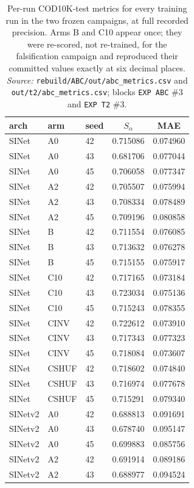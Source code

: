 \begin{table}[h]
\caption{Per-run COD10K-test metrics for every training run in the two frozen campaigns, at full
recorded precision. Arms B and C10 appear once; they were re-scored, not re-trained, for the
falsification campaign and reproduced their committed values exactly at six decimal places.
\emph{Source:} \texttt{rebuild/ABC/out/abc\_metrics.csv} and \texttt{out/t2/abc\_metrics.csv}; blocks
\texttt{EXP ABC} \#3 and \texttt{EXP T2} \#3.}
\label{tab:perrun}
\begin{center}\small
\begin{tabular}{lllcc}
\toprule
arch & arm & seed & $S_\alpha$ & MAE \\
\midrule
SINet & A0 & 42 & 0.715086 & 0.074960 \\
SINet & A0 & 43 & 0.681706 & 0.077044 \\
SINet & A0 & 45 & 0.706058 & 0.077347 \\
SINet & A2 & 42 & 0.705507 & 0.075994 \\
SINet & A2 & 43 & 0.708334 & 0.078489 \\
SINet & A2 & 45 & 0.709196 & 0.080858 \\
SINet & B & 42 & 0.711554 & 0.076085 \\
SINet & B & 43 & 0.713632 & 0.076278 \\
SINet & B & 45 & 0.715155 & 0.075917 \\
SINet & C10 & 42 & 0.717165 & 0.073184 \\
SINet & C10 & 43 & 0.723034 & 0.075136 \\
SINet & C10 & 45 & 0.715243 & 0.078355 \\
SINet & CINV & 42 & 0.722612 & 0.073910 \\
SINet & CINV & 43 & 0.717343 & 0.077323 \\
SINet & CINV & 45 & 0.718084 & 0.073607 \\
SINet & CSHUF & 42 & 0.718602 & 0.074840 \\
SINet & CSHUF & 43 & 0.716974 & 0.077678 \\
SINet & CSHUF & 45 & 0.715291 & 0.079340 \\
SINetv2 & A0 & 42 & 0.688813 & 0.091691 \\
SINetv2 & A0 & 43 & 0.678740 & 0.095147 \\
SINetv2 & A0 & 45 & 0.699883 & 0.085756 \\
SINetv2 & A2 & 42 & 0.691914 & 0.089186 \\
SINetv2 & A2 & 43 & 0.688977 & 0.094524 \\

\end{tabular}
\end{center}
\end{table}
